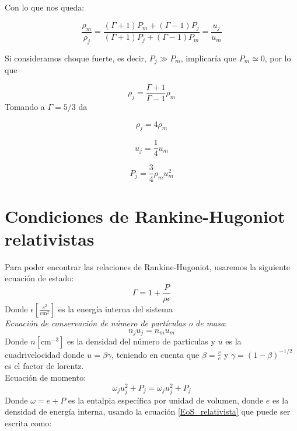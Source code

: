 \documentclass[12pt,a4paper]{book}
\begin{document}
Con lo que nos queda:

\begin{equation}\label{RH_no_rel_choque_no_fuerte}
\frac{\rho_{m}}{\rho_j} =
\frac{\left( \Gamma +1 \right) P_{m}+ \left( \Gamma -1 \right) P_{j
}}{\left(\Gamma +1 \right) P_{j}+ \left( \Gamma -1 \right) P_{m}}
= \frac{u_j}{u_m}
\end{equation}

Si consideramos choque fuerte, es decir, $P_j \gg P_m$, implicaría que $P_m \simeq 0$, por lo que

\begin{equation}
\rho_j = \frac{\Gamma +1}{\Gamma-1} \rho_m 
\end{equation}
Tomando a $\Gamma = 5/3$ da

\begin{equation}
\rho_j = 4 \rho_m
\end{equation}

\begin{equation}
u_j = \frac{1}{4} u_m
\end{equation}

\begin{equation}
P_{j} = \frac{3}{4}\rho_m u_m^{2}
\end{equation}

\chapter{Condiciones de Rankine-Hugoniot relativistas}\label{aped.C}

Para poder encontrar las relaciones de Rankine-Hugoniot, usaremos la siguiente ecuación de estado:
\begin{equation}\label{EoS_relativista}
\Gamma = 1+\frac{P}{\rho \epsilon}
\end{equation}
Donde $\epsilon \left[ \frac{s^2}{\mathrm{cm}^2}\right]$ es la energía interna del sistema\\
\textit{Ecuación de conservación de número de partículas o de masa}:
\begin{equation}\label{Ecuacion_particulas_relativista}
n_j u_j = n_m u_m
\end{equation}
Donde $n \left[ \mathrm{cm}^{-3}\right]$ es la densidad del número de partículas y $u$ es la cuadrivelocidad donde $u=\beta \gamma$, teniendo en cuenta que $\beta = \frac{v}{c}$ y $\gamma = \left( 1 - \beta \right)^{-1/2}$ es el factor de lorentz.\\

Ecuación de momento: 
\begin{equation}\label{Ecuacion_momento_relativista}
\omega_j u_{j}^{2}+P_j=\omega_j u_{j}^{2}+P_j
\end{equation}
Donde $\omega = e + P$ es la entalpia específica por unidad de volumen, donde $e$ es la densidad de energía interna, usando la ecuación \ref{EoS_relativista}  que puede ser escrita como:
\end{document}
